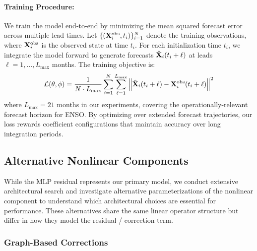 \paragraph{Training Procedure:} We train the model end-to-end by minimizing the mean squared forecast error across multiple lead times. Let $\{(\mathbf{X}_i^{\text{obs}}, t_i)\}_{i=1}^N$ denote the training observations, where $\mathbf{X}_i^{\text{obs}}$ is the observed state at time $t_i$. For each initialization time $t_i$, we integrate the model forward to generate forecasts $\hat{\mathbf{X}}_i(t_i + \ell)$ at leads $\ell = 1, \ldots, L_{\max}$ months. The training objective is:
\begin{equation}
    \mathcal{L}(\theta, \phi) = \frac{1}{N \cdot L_{\max}} \sum_{i=1}^{N} \sum_{\ell=1}^{L_{\max}} \left\| \hat{\mathbf{X}}_i(t_i + \ell) - \mathbf{X}_i^{\text{obs}}(t_i + \ell) \right\|^2
    \label{eq:loss}
\end{equation}
where $L_{\max} = 21$ months in our experiments, covering the operationally-relevant forecast horizon for ENSO. 
By optimizing over extended forecast trajectories, our loss rewards coefficient configurations that maintain accuracy over long integration periods.

\subsection{Alternative Nonlinear Components}
\label{sec:ablations}

While the MLP residual represents our primary model, we conduct extensive architectural search and investigate alternative parameterizations of the nonlinear component to understand which architectural choices are essential for performance. These alternatives share the same linear operator structure but differ in how they model the residual / correction term.

\subsubsection{Graph-Based Corrections}

